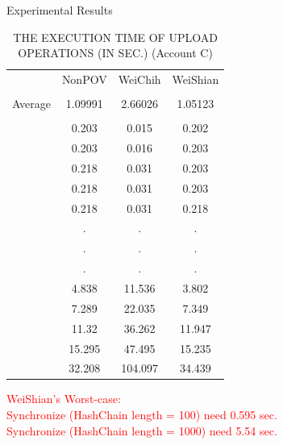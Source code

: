 \documentclass{beamer}
\newcommand{\tab}[1]{\hspace{.1\textwidth}\rlap{#1}}
\begin{document}
\begin{CJK}{UTF8}{bkai}
\begin{frame}{Experimental Results}
	\scriptsize
	\begin{table}
		\centering
		\captionsetup{justification=centering}
		\caption{\tiny THE EXECUTION TIME OF \alert{UPLOAD} OPERATIONS (IN SEC.) (Account C)}
		\begin{tabular}{|cccc|}
					& NonPOV  & WeiChih   & WeiShian \\
					&         &           &          \\
		Average		& 1.09991 & 2.66026   & 1.05123  \\
					&         &           &          \\
					& 0.203   & 0.015     & 0.202    \\
					& 0.203   & 0.016     & 0.203    \\
					& 0.218   & 0.031     & 0.203    \\
					& 0.218   & 0.031     & 0.203    \\
					& 0.218   & 0.031     & 0.218    \\
					& .       & .         & .        \\
					& .       & .         & .        \\
					& .       & .         & .        \\
					& 4.838   & 11.536    & 3.802    \\
					& 7.289   & 22.035    & 7.349    \\
					& 11.32   & 36.262    & 11.947   \\
					& 15.295  & 47.495    & 15.235   \\
					& 32.208  & 104.097   & 34.439
		\end{tabular}
	\end{table}
	\textcolor{red}{
	WeiShian's Worst-case: \\
	\tab{}\tab{}Synchronize (HashChain length = 100) need 0.595 sec.\\
	\tab{}\tab{}Synchronize (HashChain length = 1000) need 5.54 sec.
	}
\end{frame}


\end{CJK}
\end{document}
